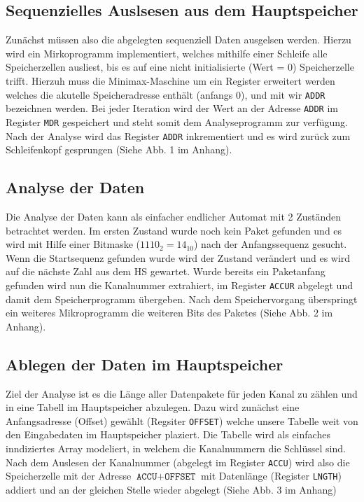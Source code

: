 \documentclass[12pt,titlepage]{article}
\begin{document}
\subsection{Sequenzielles Auslsesen aus dem Hauptspeicher}
Zun{\"a}chst m{\"u}ssen also die abgelegten sequenziell Daten ausgelsen werden. Hierzu wird ein Mirkoprogramm implementiert, welches mithilfe
einer Schleife alle Speicherzellen ausliest, bis es auf eine nicht initialisierte (Wert = 0) Speicherzelle trifft. 
Hierzuh muss die Minimax-Maschine um ein Register erweitert werden welches die akutelle Speicheradresse enth{\"a}lt (anfangs 0),
und mit wir \texttt{ADDR} bezeichnen werden. Bei jeder Iteration wird der Wert an der Adresse \texttt{ADDR} im Register 
\texttt{MDR} gespeichert und steht somit dem Analyseprogramm zur verf{\"u}gung. Nach der Analyse wird das Register \texttt{ADDR}
inkrementiert und es wird zur{\"u}ck zum Schleifenkopf gesprungen (Siehe Abb. 1 im Anhang).

\subsection{Analyse der Daten}
Die Analyse der Daten kann als einfacher endlicher Automat mit 2 Zuständen betrachtet werden. Im ersten Zustand wurde noch kein Paket
gefunden und es wird mit Hilfe einer Bitmaske ($1110_{2} = 14_{10}$) nach der Anfangssequenz gesucht. Wenn die Startsequenz gefunden wurde wird der Zustand
verändert und es wird auf die nächste Zahl aus dem HS gewartet. Wurde bereits ein Paketanfang gefunden wird nun die Kanalnummer
extrahiert, im Register \texttt{ACCUR} abgelegt und damit dem Speicherprogramm übergeben. Nach dem Speichervorgang überspringt ein weiteres Mikroprogramm
die weiteren Bits des Paketes (Siehe Abb. 2 im Anhang).

\subsection{Ablegen der Daten im Hauptspeicher}
Ziel der Analyse ist es die Länge aller Datenpakete für jeden Kanal zu zählen und in eine Tabell im Hauptspeicher abzulegen.
Dazu wird zunächst eine Anfangsadresse (Offset) gewählt (Regsiter \texttt{OFFSET}) welche unsere Tabelle weit von den Eingabedaten
im Hauptspeicher plaziert. Die Tabelle wird als einfaches inndiziertes Array modeliert, in welchem die Kanalnummern die
Schlüssel sind. Nach dem Auslesen der Kanalnummer (abgelegt im Register \texttt{ACCU}) wird also die Speicherzelle mit der Adresse 
$\texttt{ACCU} + \texttt{OFFSET}$ mit Datenlänge (Register \texttt{LNGTH}) addiert und an der gleichen Stelle wieder abgelegt (Siehe
Abb. 3 im Anhang)
\end{document}
